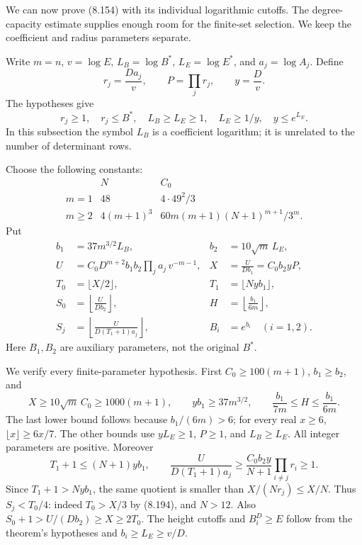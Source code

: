 \documentclass[
  11pt,
  a4paper,
]{article}
\begin{document}
We can now prove (8.154) with its individual logarithmic cutoffs. The
degree-capacity estimate supplies enough room for the finite-set
selection. We keep the coefficient and radius parameters separate.

Write \(m=n\), \(v=\log E\), \(L_B=\log B^*\), \(L_E=\log E^*\), and
\(a_j=\log A_j\). Define \[
r_j=\frac{Da_j}{v},\qquad P=\prod_jr_j,\qquad y=\frac Dv .
\] The hypotheses give \[
r_j\ge1,\quad r_j\le B^*,\quad
L_B\ge L_E\ge1,\quad L_E\ge1/y,\quad y\le e^{L_E}.
\tag{8.191}
\] In this subsection the symbol \(L_B\) is a coefficient logarithm; it
is unrelated to the number of determinant rows.

Choose the following constants: \[
\begin{array}{c|c|c}
 &N&C_0\\ \hline
m=1&48&4\cdot49^2/3\\
m\ge2&4(m+1)^3&
60m(m+1)(N+1)^{m+1}/3^m .
\end{array}
\tag{8.192}
\] Put \[
\begin{aligned}
b_1&=37m^{3/2}L_B,& b_2&=10\sqrt m\,L_E,\\
U&=C_0D^{m+2}b_1b_2\prod_ja_j\,v^{-m-1},&
X&=\frac{U}{Db_1}=C_0b_2yP,\\
T_0&=\lfloor X/2\rfloor,&
T_1&=\lfloor Nyb_1\rfloor,\\
S_0&=\left\lfloor\frac{U}{Db_2}\right\rfloor,&
H&=\left\lfloor\frac{b_1}{6m}\right\rfloor,\\
S_j&=\left\lfloor\frac{U}{D(T_1+1)a_j}\right\rfloor,&
B_i&=e^{b_i}\quad(i=1,2).
\end{aligned}
\tag{8.193}
\] Here \(B_1,B_2\) are auxiliary parameters, not the original \(B^*\).

We verify every finite-parameter hypothesis. First \(C_0\ge100(m+1)\),
\(b_1\ge b_2\), and \[
X\ge10\sqrt m\,C_0\ge1000(m+1),\qquad
yb_1\ge37m^{3/2},\qquad
\frac{b_1}{7m}\le H\le\frac{b_1}{6m}.
\tag{8.194}
\] The last lower bound follows because \(b_1/(6m)>6\); for every real
\(x\ge6\), \(\lfloor x\rfloor\ge6x/7\). The other bounds use
\(yL_E\ge1\), \(P\ge1\), and \(L_B\ge L_E\). All integer parameters are
positive. Moreover \[
T_1+1\le(N+1)yb_1,\qquad
\frac{U}{D(T_1+1)a_j}
\ge\frac{C_0b_2y}{N+1}\prod_{i\ne j}r_i\ge1.
\] Since \(T_1+1>Nyb_1\), the same quotient is smaller than
\(X/(Nr_j)\le X/N\). Thus \(S_j<T_0/4\): indeed \(T_0>X/3\) by (8.194),
and \(N>12\). Also \(S_0+1>U/(Db_2)\ge X\ge2T_0\). The height cutoffs
and \(B_i^D\ge E\) follow from the theorem's hypotheses and
\(b_i\ge L_E\ge v/D\).
\end{document}
